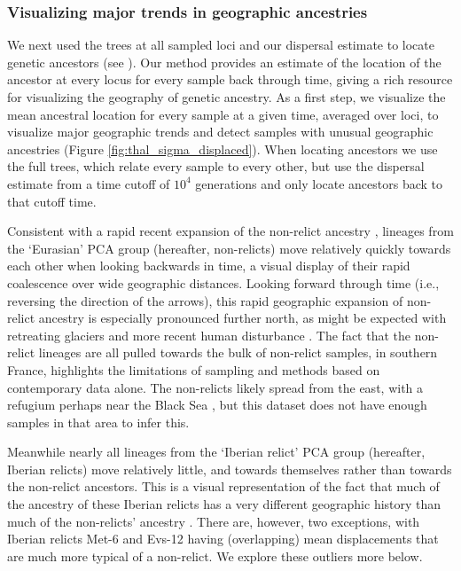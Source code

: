 \documentclass[12pt]{article}
\begin{document}
\subsubsection*{Visualizing major trends in geographic ancestries}

We next used the trees at all sampled loci and our dispersal estimate to locate genetic ancestors (see ). Our method provides an estimate of the location of the ancestor at every locus for every sample back through time, giving a rich resource for visualizing the geography of genetic ancestry.
As a first step, we visualize the mean ancestral location for every sample at a given time, averaged over loci, to visualize major geographic trends and detect samples with unusual geographic ancestries (Figure \ref{fig:thal_sigma_displaced}).
When locating ancestors we use the full trees, which relate every sample to every other, but use the dispersal estimate from a time cutoff of $10^4$ generations and only locate ancestors back to that cutoff time. 

Consistent with a rapid recent expansion of the non-relict ancestry \citep{lee2017post,hsu2019postglacial}, lineages from the `Eurasian' PCA group (hereafter, non-relicts) move relatively quickly towards each other when looking backwards in time, a visual display of their rapid coalescence over wide geographic distances. 
Looking forward through time (i.e., reversing the direction of the arrows), this rapid geographic expansion of non-relict ancestry is especially pronounced further north, as might be expected with retreating glaciers and more recent human disturbance \citep{lee2017post}. 
The fact that the non-relict lineages are all pulled towards the bulk of non-relict samples, in southern France, highlights the limitations of sampling and methods based on contemporary data alone.
The non-relicts likely spread from the east, with a refugium perhaps near the Black Sea \citep{lee2017post,hsu2019postglacial}, but this dataset does not have enough samples in that area to infer this.

Meanwhile nearly all lineages from the `Iberian relict' PCA group (hereafter, Iberian relicts) move relatively little, and towards themselves rather than towards the non-relict ancestors. 
This is a visual representation of the fact that much of the ancestry of these Iberian relicts has a very different geographic history than much of the non-relicts' ancestry \citep{alonso2016,fulgione2018archaic}. 
There are, however, two exceptions, with Iberian relicts Met-6 and Evs-12 having (overlapping) mean displacements that are much more typical of a non-relict. 
We explore these outliers more below.
\end{document}
